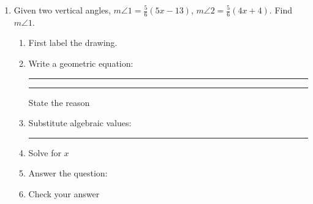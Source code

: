 \documentclass[12pt, oneside]{article}
\begin{document}
\begin{enumerate}
\newpage
    \item Given two vertical angles, $m \angle 1 = \frac{5}{6}(5x-13)$, $m \angle 2 = \frac{5}{6}(4x+4)$. Find $m \angle 1$.
    \begin{enumerate}
      \item First label the drawing.
      \begin{flushright}
      \end{flushright}
      \vspace{1cm}
      \item Write a geometric equation: \rule{4cm}{0.15mm} \hspace{1cm} \rule{4cm}{0.15mm}
      \begin{flushright} State the reason \end{flushright}
      \vspace{.7cm}
      \item Substitute algebraic values: \rule{4cm}{0.15mm}
      \item Solve for $x$
      \vspace{4cm}
      \item Answer the question:
      \vspace{3cm}
      \item Check your answer
    \end{enumerate}


\end{enumerate}
\end{document}
